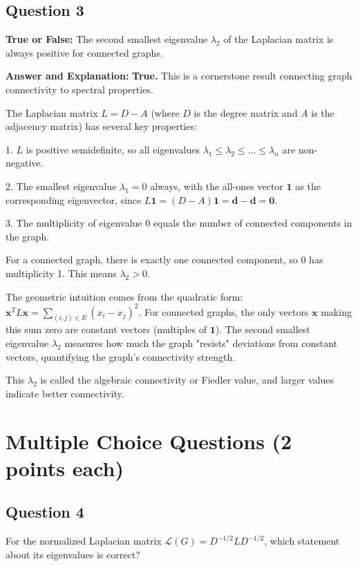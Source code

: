 \documentclass[11pt]{article}
\newenvironment{answer}{\color{answercolor}\begin{framed}\textbf{Answer and Explanation:}}{\end{framed}}
\begin{document}
\subsection{Question 3}
\textbf{True or False:} The second smallest eigenvalue $\lambda_2$ of the Laplacian matrix is always positive for connected graphs.

\begin{answer}
\textbf{True.} This is a cornerstone result connecting graph connectivity to spectral properties.

The Laplacian matrix $L = D - A$ (where $D$ is the degree matrix and $A$ is the adjacency matrix) has several key properties:

1. $L$ is positive semidefinite, so all eigenvalues $\lambda_1 \leq \lambda_2 \leq \ldots \leq \lambda_n$ are non-negative.

2. The smallest eigenvalue $\lambda_1 = 0$ always, with the all-ones vector $\mathbf{1}$ as the corresponding eigenvector, since $L\mathbf{1} = (D-A)\mathbf{1} = \mathbf{d} - \mathbf{d} = \mathbf{0}$.

3. The multiplicity of eigenvalue 0 equals the number of connected components in the graph.

For a connected graph, there is exactly one connected component, so 0 has multiplicity 1. This means $\lambda_2 > 0$.

The geometric intuition comes from the quadratic form: $\mathbf{x}^T L \mathbf{x} = \sum_{(i,j) \in E} (x_i - x_j)^2$. For connected graphs, the only vectors $\mathbf{x}$ making this sum zero are constant vectors (multiples of $\mathbf{1}$). The second smallest eigenvalue $\lambda_2$ measures how much the graph "resists" deviations from constant vectors, quantifying the graph's connectivity strength.

This $\lambda_2$ is called the algebraic connectivity or Fiedler value, and larger values indicate better connectivity.
\end{answer}

\section{Multiple Choice Questions (2 points each)}

\subsection{Question 4}
For the normalized Laplacian matrix $\mathcal{L}(G) = D^{-1/2}LD^{-1/2}$, which statement about its eigenvalues is correct?
\end{document}
